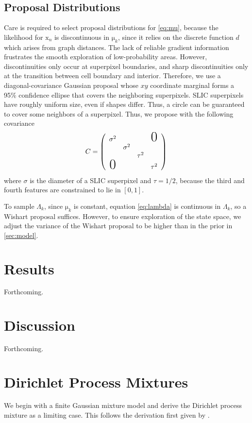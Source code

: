 \documentclass[english]{article}
\newcommand{\+}[1]{\ensuremath{\boldsymbol{\mathrm{#1}}}}
\begin{document}
\subsection{Proposal Distributions}
Care is required to select proposal distributions for \eqref{eq:mu}, because the likelihood for $\+x_n$ is discontinuous in $\+\mu_k$, since it relies on the discrete function $d$ which arises from graph distances. The lack of reliable gradient information frustrates the smooth exploration of low-probability areas. However, discontinuities only occur at superpixel boundaries, and sharp discontinuities only at the transition between cell boundary and interior. Therefore, we use a diagonal-covariance Gaussian proposal whose $xy$ coordinate marginal forms a 95\% confidence ellipse that covers the neighboring superpixels. SLIC superpixels have roughly uniform size, even if shapes differ. Thus, a circle can be guaranteed to cover some neighbors of a superpixel. Thus, we propose with the following covariance
\[
C = \left(\begin{array}{cccc}
    \sigma^{2} & & & \text{\huge 0}\\
     & \sigma^{2} & & \\
      &  & \tau^{2} &\\
    \text{\huge 0} &  &  & \tau^{2}
     \end{array}\right)
\]
where $\sigma$ is the diameter of a SLIC superpixel and $\tau = 1/2$, because the third and fourth features are constrained to lie in $[0, 1]$.

To sample $\Lambda_k$, since $\+\mu_k$ is constant, equation \eqref{eq:lambda} is continuous in $\Lambda_k$, so a Wishart proposal suffices. However, to ensure exploration of the state space, we adjust the variance of the Wishart proposal to be higher than in the prior in \ref{sec:model}.

\section{Results}
Forthcoming.

\section{Discussion}
Forthcoming.

\appendix
\section{Dirichlet Process Mixtures}
\label{sec:mdp}
We begin with a finite Gaussian mixture model and derive the Dirichlet process mixture as a limiting case. This follows the derivation first given by \cite{Rasmussen2000}.
\end{document}
